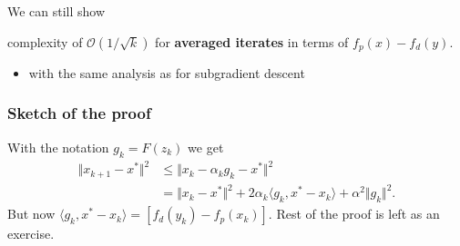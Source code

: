 \documentclass{beamer}
\begin{document}
\begin{frame}
  \frametitle{}

We can still show
  \begin{theorem}
    complexity of $\mathcal{O}(1/\sqrt{k})$ for \textbf{averaged iterates} in terms of $f_p(x) - f_d(y)$.
  \end{theorem}

  \begin{itemize}
    \item with the same analysis as for subgradient descent
  \end{itemize}
\end{frame}

\begin{frame}
  \frametitle{Sketch of the proof}
  With the notation $g_k = F(z_k)$ we get
  \begin{equation}
    \begin{aligned}
      \Vert x_{k+1} - x^* \Vert^2 &\le \Vert x_k - \alpha_k g_k - x^* \Vert^2 \\
      &= \Vert x_k-x^* \Vert^2 + 2 \alpha_k \langle g_k, x^*-x_k \rangle + \alpha^2 \Vert g_k \Vert^2.
    \end{aligned}
  \end{equation}
  But now $\langle g_k, x^* - x_k \rangle = [f_d(y_k) - f_p(x_k)]$.
  Rest of the proof is left as an exercise.
\end{frame}
\end{document}
